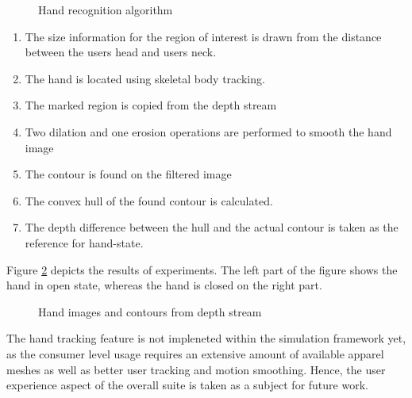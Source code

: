\begin{figure}[h]
\centerline{}
\caption{Hand recognition algorithm}
\label{fig:hand_recognition_cycle}
\end{figure} 

\begin{enumerate}
\item The size information for the region of interest is drawn from the distance between the users head and users neck.
\item The hand is located using skeletal body tracking.
\item The marked region is copied from the depth stream 
\item Two dilation and one erosion operations are performed to smooth the hand image
\item The contour is found on the filtered image
\item The convex hull of the found contour is calculated.
\item The depth difference between the hull and the actual contour is taken as the reference for hand-state.
\end{enumerate}

Figure \ref{fig:open_closed_hands} depicts the results of experiments. The left part of the figure shows the hand in open state, whereas the hand is closed on the right part.

\begin{figure}[h]
\centerline{}
\caption{Hand images and contours from depth stream}
\label{fig:open_closed_hands}
\end{figure}

The hand tracking feature is not impleneted within the simulation framework yet, as the consumer level usage requires an extensive amount of available apparel meshes as well as better user tracking and motion smoothing. Hence, the user experience aspect of the overall suite is taken as a subject for future work.

